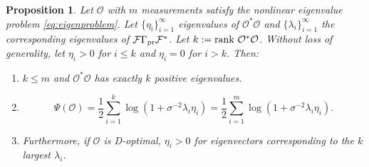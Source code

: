 \documentclass[ba]{imsart}
\newcommand{\obs}{\mathcal{O}}
\newcommand{\fwd}{\mathcal{F}}
\newcommand{\tar}{\Psi}
\newcommand{\rank}{\textup{rank}\ }
\theoremstyle{plain}
\newtheorem{proposition}[theorem]{Proposition}
\theoremstyle{definition}
\theoremstyle{remark}
\begin{document}
\begin{proposition}\label{prop:true_target}
  Let $\obs$ with $m$ measurements satisfy the nonlinear eigenvalue
  problem \eqref{eq:eigenproblem}. Let $\{\eta_i\}_{i=1}^{\infty}$
  eigenvalues of $\obs^*\obs$ and $\{\lambda_i\}_{i=1}^{\infty}$ the
  corresponding eigenvalues of $\fwd \prcov \fwd^*$. Let $k:=\rank
  \obs^*\obs$. Without loss of generality, let $\eta_i > 0$ for $i\leq
  k$ and $\eta_i = 0$ for $i > k$. Then:
  \begin{enumerate}
    \item $k \leq m$ and $\obs^*\obs$ has exactly $k$ positive
      eigenvalues.
    \item
      \begin{equation*}
        \tar(\obs) = \frac{1}{2} \sum_{i=1}^{k} \log (1 + \sigma^{-2}\lambda_i\eta_i) = \frac{1}{2} \sum_{i=1}^{m} \log (1 + \sigma^{-2}\lambda_i\eta_i).
      \end{equation*}
    \item Furthermore, if $\obs$ is D-optimal, $\eta_i > 0$ for
      eigenvectors corresponding to the $k$ largest $\lambda_i$.
  \end{enumerate}
\end{proposition}
\end{document}

